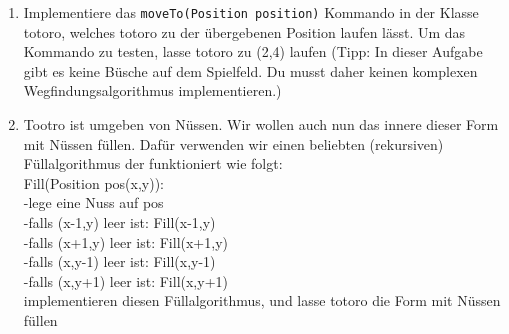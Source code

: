 
\begin{enumerate}
\item Implementiere das \lstinline{moveTo(Position position)} Kommando in der Klasse totoro, welches totoro zu der übergebenen Position laufen lässt. Um das Kommando zu testen, lasse totoro zu (2,4) laufen (Tipp: In dieser Aufgabe gibt es keine Büsche auf dem Spielfeld. Du musst daher keinen komplexen Wegfindungsalgorithmus implementieren.)
\item Tootro ist umgeben von Nüssen. Wir wollen auch nun das innere dieser Form mit Nüssen füllen. Dafür verwenden wir einen beliebten (rekursiven) Füllalgorithmus der funktioniert wie folgt:\\
Fill(Position pos(x,y)):\\
-lege eine Nuss auf pos\\
-falls (x-1,y) leer ist: Fill(x-1,y)\\
-falls (x+1,y) leer ist: Fill(x+1,y)\\
-falls (x,y-1) leer ist: Fill(x,y-1)\\
-falls (x,y+1) leer ist: Fill(x,y+1)\\

implementieren diesen Füllalgorithmus, und lasse totoro die Form mit Nüssen füllen
\end{enumerate}
